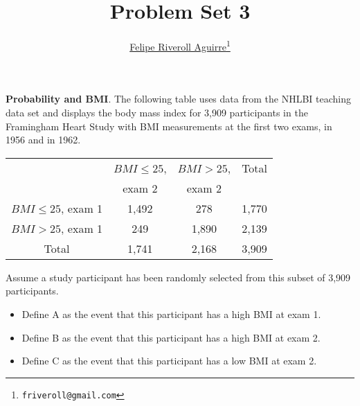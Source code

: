 \documentclass{article}
\begin{document}


\title{Problem Set 3}
\author{\href{http://feliperiveroll.name}{Felipe Riveroll Aguirre}\footnote{\texttt{friveroll@gmail.com}}} 
\maketitle

\textbf{Probability and BMI}. The following table uses data from the NHLBI teaching data set and displays the 
body mass index for 3,909 participants in the Framingham Heart Study with BMI measurements at the 
first two exams, in 1956 and in 1962.  

\begin{table}[ht]
\begin{center}
\begin{tabular}{c|cc|c}
                      & \(BMI \leq 25\),   & \(BMI > 25\), & Total \\
                      & exam 2         & exam 2    &  \\
\hline
\(BMI \leq 25\), exam 1   & 1,492          & 278       & 1,770 \\
\(BMI > 25\),    exam 1   & 249            & 1,890     & 2,139 \\
\hline
Total                 & 1,741          & 2,168     & 3,909 \\
\end{tabular}
\end{center}
\end{table}

Assume a study participant has been randomly selected from this subset of 3,909 participants.

\begin{itemize}
\item Define A as the event that this participant has a high BMI at exam 1.
\item Define B as the event that this participant has a high BMI at exam 2.
\item Define C as the event that this participant has a low BMI at exam 2.\end{itemize}
\end{document}
